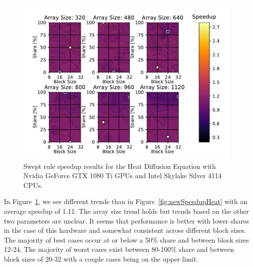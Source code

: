 \documentclass[preprints,article,accept,moreauthors,pdftex]{Definitions/mdpi}
\newcommand\fs{0.7}
\def\oldCPU{Intel Skylake Silver 4114} %
\def\oldGPU{Nvidia GeForce GTX 1080 Ti}
\begin{document}
\begin{figure}[H]
    
    \begin{center}
        \includegraphics[scale=\fs, trim={0.75cm 0.4cm 0.8cm 0.7cm},clip]{figs/speedUpheatOld.pdf}
        \caption{Swept rule speedup results for the Heat Diffusion Equation with \oldGPU{} GPUs and \oldCPU{} CPUs.}
        \label{fig:oldSpeedupHeat} 
    \end{center}
\end{figure}




In Figure~\ref{fig:oldSpeedupHeat}, we see different trends than in Figure~\ref{fig:newSpeedupHeat} with an average speedup of 1.11. The array size trend holds but trends based on the other two parameters are unclear. It seems that performance is better with lower shares in the case of this hardware and somewhat consistent across different block sizes. The majority of best cases occur at or below a 50\% share and between block sizes 12-24. The majority of worst cases exist between 80-100\% share and between block sizes of 20-32 with a couple cases being on the upper limit.
\end{document}
